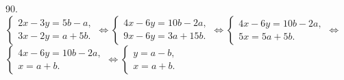 90. $\begin{cases}2x-3y=5b-a,\\ 3x-2y=a+5b. \end{cases}\Leftrightarrow
\begin{cases}4x-6y=10b-2a,\\ 9x-6y=3a+15b. \end{cases}\Leftrightarrow
\begin{cases}4x-6y=10b-2a,\\ 5x=5a+5b. \end{cases}\Leftrightarrow$\\$
\begin{cases}4x-6y=10b-2a,\\ x=a+b. \end{cases}\Leftrightarrow
\begin{cases}y=a-b,\\ x=a+b. \end{cases}$\\
